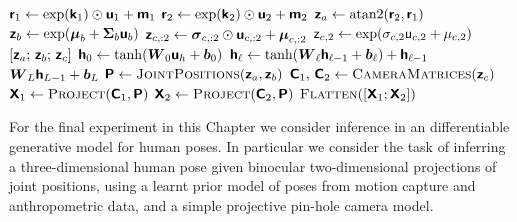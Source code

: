 \begin{algorithm}
\begin{algorithmic}
  \State $\boldsymbol{\mathsf{r}}_1 \gets \exp(\boldsymbol{\mathsf{k}}_1) \odot \boldsymbol{\mathsf{u}}_1 + \boldsymbol{\mathsf{m}}_1$
  \State $\boldsymbol{\mathsf{r}}_2 \gets \exp(\boldsymbol{\mathsf{k}}_2) \odot \boldsymbol{\mathsf{u}}_2 + \boldsymbol{\mathsf{m}}_2$
  \State $\boldsymbol{\mathsf{z}}_a \gets \textrm{atan2}(\boldsymbol{\mathsf{r}}_2, \boldsymbol{\mathsf{r}}_1)$
  \State $\rvct{z}_b \gets \exp\lpa \vct{\mu}_b + \mtx{\Sigma}_b \rvct{u}_b\rpa$
  \State $\boldsymbol{\mathsf{z}}_{c,:2} \gets \boldsymbol{\sigma}_{c,:2} \odot \boldsymbol{\mathsf{u}}_{c,:2} + \boldsymbol{\mu}_{c,:2}$
  \State $\rvar{z}_{c,2} \gets \exp\lpa \sigma_{c,2}  \rvar{u}_{c,2} + \mu_{c,2} \rpa$
  \State \Return $[\boldsymbol{\mathsf{z}}_a;\,\boldsymbol{\mathsf{z}}_b;\,\boldsymbol{\mathsf{z}}_c]$
\EndFunction
{}
  \State $\rvct{h}_0 \gets \tanh\lpa\mtx{W}_0 \rvct{u}_h + \vct{b}_0\rpa$
    \State $\rvct{h}_\ell \gets \tanh\lpa \mtx{W}_\ell \rvct{h}_{\ell -1} + \vct{b}_\ell \rpa + \rvct{h}_{\ell - 1}$
  \EndFor
  \State \Return $\boldsymbol{W}_{L}\boldsymbol{\mathsf{h}}_{L-1} + \boldsymbol{b}_L$
\EndFunction
{}
  \State $\rvct{P} \gets \Call{JointPositions}{\rvct{z}_a,\rvct{z}_b}$
  \State $\rvct{C}_1,\,\rvct{C}_2 \gets \Call{CameraMatrices}{\rvct{z}_c}$
  \State $\rvct{X}_1 \gets \Call{Project}{\rvct{C}_1, \rvct{P}}$
  \State $\rvct{X}_2 \gets \Call{Project}{\rvct{C}_2, \rvct{P}}$
  \State \Return $\Call{Flatten}{[\rvct{X}_1; \rvct{X}_2]}$
\EndFunction
\end{algorithmic}
\end{algorithm}

For the final experiment in this Chapter we consider inference in an differentiable generative model for human poses. In particular we consider the task of inferring a three-dimensional human pose given binocular two-dimensional projections of joint positions, using a learnt prior model of poses from motion capture and anthropometric data, and a simple projective pin-hole camera model. %


